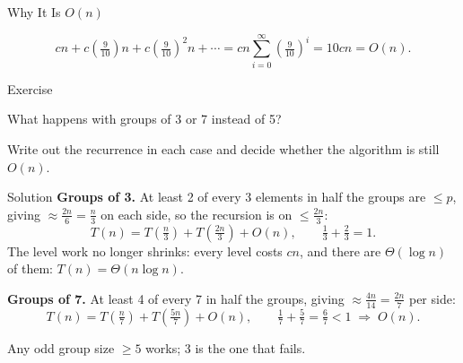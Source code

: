 \documentclass[10pt,aspectratio=169]{beamer}
\begin{document}
\begin{frame}{Why It Is $O(n)$}
  \begin{center}
  \end{center}

  \[
    cn + c\left(\tfrac{9}{10}\right)n + c\left(\tfrac{9}{10}\right)^2 n + \cdots
    = cn \sum_{i=0}^{\infty}\left(\tfrac{9}{10}\right)^i
    = 10cn = O(n).
  \]
\end{frame}

\begin{frame}{Exercise}
  \begin{center}
    What happens with groups of \alert{3} or \alert{7} instead of 5?
  \end{center}

  \bigskip
  Write out the recurrence in each case and decide whether the algorithm is still $O(n)$.
\end{frame}

\begin{frame}{Solution}
  \textbf{Groups of 3.} At least 2 of every 3 elements in half the groups are $\le p$, giving $\approx \frac{2n}{6} = \frac{n}{3}$ on each side, so the recursion is on $\le \frac{2n}{3}$:
  \[
    T(n) = T\!\left(\tfrac{n}{3}\right) + T\!\left(\tfrac{2n}{3}\right) + O(n),
    \qquad \tfrac13 + \tfrac23 = 1.
  \]
  The level work no longer shrinks: every level costs $cn$, and there are $\Theta(\log n)$ of them:
  \alert{$T(n) = \Theta(n \log n)$}.

  \bigskip
  \textbf{Groups of 7.} At least 4 of every 7 in half the groups, giving $\approx \frac{4n}{14} = \frac{2n}{7}$ per side:
  \[
    T(n) = T\!\left(\tfrac{n}{7}\right) + T\!\left(\tfrac{5n}{7}\right) + O(n),
    \qquad \tfrac17 + \tfrac57 = \tfrac67 < 1
    \;\Longrightarrow\; O(n).
  \]

  \begin{center}
    \small Any odd group size $\ge 5$ works; 3 is the one that fails.
  \end{center}
\end{frame}
\end{document}
